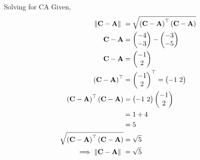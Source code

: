 Solving for CA
Given, 
\begin{align}  
	\norm{\vec{C}-\vec{A}}\ &=  \sqrt{\brak{\vec{C}-\vec{A}}^{\top}\brak{\vec{C}-\vec{A}}} \\
 \vec{C}-\vec{A} &= \myvec{-4 \\ -3} - \myvec{-3 \\ -5} \\
 \vec{C}-\vec{A} &= \myvec{-1 \\ 2} \\
 \brak{\vec{C}-\vec{A}}^{\top} &= {\myvec{-1 \\ 2}}^{\top} = \myvec{-1 \ 2} \\
	\brak{\vec{C}-\vec{A}}^{\top}\brak{\vec{C}-\vec{A}} &= \myvec{-1 \ 2} \myvec{-1 \\ 2}\\
             &= 1 + 4 \\
             &= 5 \\  
	\sqrt{\brak{\vec{C}-\vec{A}}^{\top}\brak{\vec{C}-\vec{A}}} &= \sqrt{5}	\\
	\implies \norm{\vec{C}-\vec{A}}\ &= \sqrt{5} 
\end{align}

